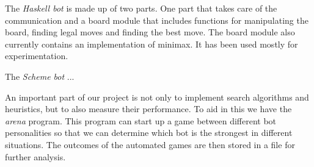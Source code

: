 The \emph{Haskell bot} is made up of two parts. One part that takes care
of the communication and a board module that includes functions for manipulating
the board, finding legal moves and finding the best move. The board module
also currently contains an implementation of minimax. It has been
used mostly for experimentation.

The \emph{Scheme bot} ... %

An important part of our project is not only to implement search
algorithms and heuristics, but to also measure their performance. To
aid in this we have the \emph{arena} program. This program can start
up a game between different bot personalities so that we can determine
which bot is the strongest in different situations.
The outcomes of the automated games are then stored in a file for further
analysis.

